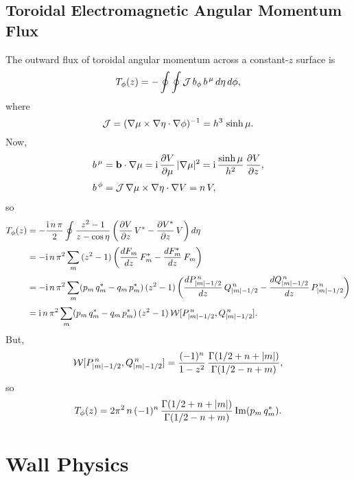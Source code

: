 \documentclass[12pt,prb,aps,notitlepage]{revtex4-1}
\begin{document}
\subsection{Toroidal Electromagnetic Angular Momentum Flux}
The outward flux of toroidal angular momentum across a constant-$z$ surface is
\begin{align}
T_\phi(z) = -\oint\oint {\cal J} \,b_\phi\,b^{\,\mu}\,d\eta\,d\phi,
\end{align}
where
\begin{equation}
{\cal J} = (\nabla\mu\times\nabla\eta\cdot\nabla\phi)^{-1} = h^3\,\sinh\mu.
\end{equation}
Now,
\begin{align}
b^{\,\mu} &= {\bf b}\cdot\nabla\mu = {\rm i}\,\frac{\partial V}{\partial \mu}\,|\nabla\mu|^2 = {\rm i}\,\frac{\sinh\mu}{h^2}\,\frac{\partial V}{\partial z},\\[0.5ex]
b^{\,\phi}&= {\cal J}\,\nabla\mu\times\nabla \eta\cdot\nabla V = n\,V,
\end{align}
so
\begin{align}
T_\phi(z) &= -\frac{{\rm i}\,n\,\pi}{2}\oint \frac{z^2-1}{z-\cos\eta}\left(\frac{\partial V}{\partial z}\,V^\ast -\frac{\partial V^{\ast}}{\partial z}\,V\right)d\eta\nonumber\\[0.5ex]
&= - {\rm i}\,n\,\pi^2\sum_{m}\, (z^2-1)\left(\frac{dF_m}{dz}\,F_{m}^\ast -\frac{dF_m^\ast}{dz}\,F_{m}\right)\nonumber\\[0.5ex]
&= -{\rm i}\,n\,\pi^2\sum_{m}(p_m\,q_m^\ast-q_m\,p_m^{\ast})\,(z^2-1)\left(\frac{dP_{|m|-1/2}^{\,n}}{dz}\,Q_{|m|-1/2}^{\,n}- \frac{dQ_{|m|-1/2}^{\,n}}{dz}\,P_{|m|-1/2}^{\,n}\right)\nonumber\\[0.5ex]
& ={\rm i}\,n\,\pi^2\sum_{m}(p_m\,q_m^\ast-q_m\,p_m^{\ast})\,(z^2-1)\,{\cal W}[P_{|m|-1/2}^{\,n},Q_{|m|-1/2}^{\,n}].
\end{align}
But,
\begin{equation}
{\cal W}[P_{|m|-1/2}^{\,n},Q_{|m|-1/2}^{\,n}]= \frac{(-1)^n}{1-z^2}\,\frac{\Gamma(1/2+n+|m|)}{\Gamma(1/2-n+m)},
\end{equation}
so
\begin{equation}
T_\phi(z) = 2\pi^2\,n\,(-1)^n\,\frac{\Gamma(1/2+n+|m|)}{\Gamma(1/2-n+m)}\,{\rm Im}(p_m\,q_m^\ast).
\end{equation}

\section{Wall Physics}
\end{document}
